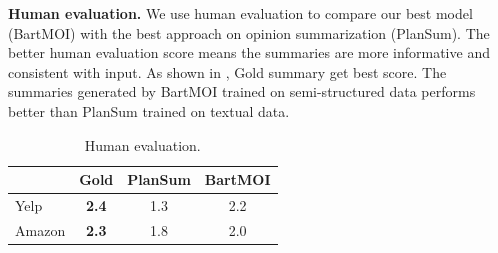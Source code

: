 \textbf{Human evaluation.} 
We use human evaluation to compare our best model (BartMOI) with the best approach on opinion summarization (PlanSum).
The better human evaluation score means the summaries
are more informative and consistent with input.
As shown in , 
Gold summary get best score.
The summaries generated by BartMOI trained on semi-structured data
performs better than PlanSum trained on textual data.


\begin{table}[th]
	\centering
	\small
	\begin{tabular}{|l|c|c|c|}
		\hline 
		& Gold & PlanSum & BartMOI\\
		\hline
		Yelp & \bf{2.4} &  1.3 & 2.2\\
		Amazon &\bf{2.3} & 1.8 & 2.0 \\
		\hline
	\end{tabular}
	\caption{Human evaluation. \protect\footnotemark
	}\label{tab:human}  
\end{table}
~









